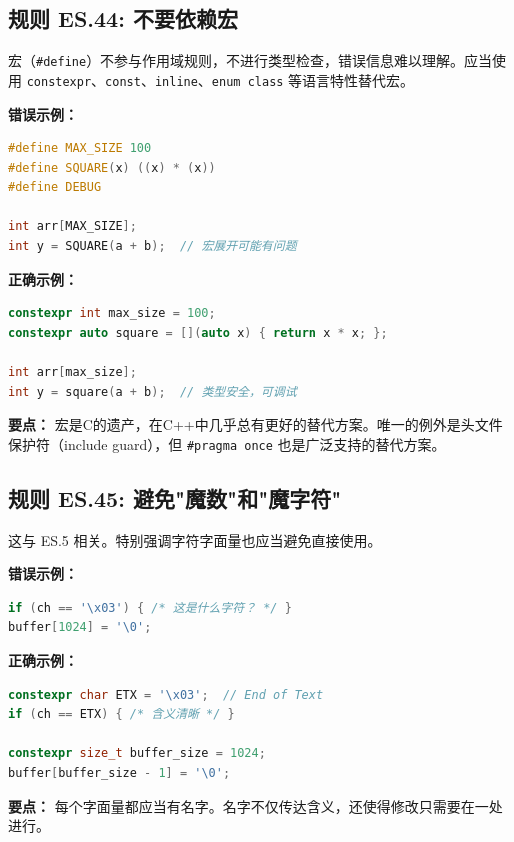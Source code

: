 \subsection*{\textbf{规则 ES.44:} 不要依赖宏}

宏（\texttt{\#define}）不参与作用域规则，不进行类型检查，错误信息难以理解。应当使用 \texttt{constexpr}、\texttt{const}、\texttt{inline}、\texttt{enum class} 等语言特性替代宏。

\textbf{错误示例：}

\begin{lstlisting}[language=C++]
#define MAX_SIZE 100
#define SQUARE(x) ((x) * (x))
#define DEBUG

int arr[MAX_SIZE];
int y = SQUARE(a + b);  // 宏展开可能有问题
\end{lstlisting}

\textbf{正确示例：}

\begin{lstlisting}[language=C++]
constexpr int max_size = 100;
constexpr auto square = [](auto x) { return x * x; };

int arr[max_size];
int y = square(a + b);  // 类型安全，可调试
\end{lstlisting}

\textbf{要点：} 宏是C的遗产，在C++中几乎总有更好的替代方案。唯一的例外是头文件保护符（include guard），但 \texttt{\#pragma once} 也是广泛支持的替代方案。

\subsection*{\textbf{规则 ES.45:} 避免"魔数"和"魔字符"}

这与 ES.5 相关。特别强调字符字面量也应当避免直接使用。

\textbf{错误示例：}

\begin{lstlisting}[language=C++]
if (ch == '\x03') { /* 这是什么字符？ */ }
buffer[1024] = '\0';
\end{lstlisting}

\textbf{正确示例：}

\begin{lstlisting}[language=C++]
constexpr char ETX = '\x03';  // End of Text
if (ch == ETX) { /* 含义清晰 */ }

constexpr size_t buffer_size = 1024;
buffer[buffer_size - 1] = '\0';
\end{lstlisting}

\textbf{要点：} 每个字面量都应当有名字。名字不仅传达含义，还使得修改只需要在一处进行。

